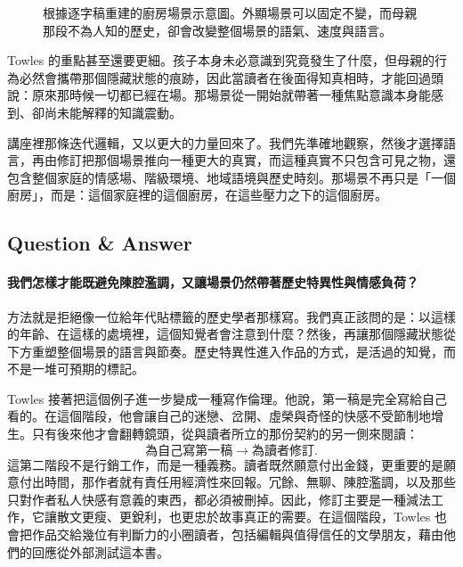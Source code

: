 \begin{figure}[h]
\centering
{}
\caption{根據逐字稿重建的廚房場景示意圖。外顯場景可以固定不變，而母親那段不為人知的歷史，卻會改變整個場景的語氣、速度與語言。}
\end{figure}

Towles 的重點甚至還要更細。孩子本身未必意識到究竟發生了什麼，但母親的行為必然會攜帶那個隱藏狀態的痕跡，因此當讀者在後面得知真相時，才能回過頭說：原來那時候一切都已經在場。那場景從一開始就帶著一種焦點意識本身能感到、卻尚未能解釋的知識震動。

講座裡那條迭代邏輯，又以更大的力量回來了。我們先準確地觀察，然後才選擇語言，再由修訂把那個場景推向一種更大的真實，而這種真實不只包含可見之物，還包含整個家庭的情感場、階級環境、地域語境與歷史時刻。那場景不再只是「一個廚房」，而是：這個家庭裡的這個廚房，在這些壓力之下的這個廚房。

\subsection{Question \& Answer}

\paragraph{我們怎樣才能既避免陳腔濫調，又讓場景仍然帶著歷史特異性與情感負荷？}

方法就是拒絕像一位給年代貼標籤的歷史學者那樣寫。我們真正該問的是：以這樣的年齡、在這樣的處境裡，這個知覺者會注意到什麼？然後，再讓那個隱藏狀態從下方重塑整個場景的語言與節奏。歷史特異性進入作品的方式，是活過的知覺，而不是一堆可預期的標記。

Towles 接著把這個例子進一步變成一種寫作倫理。他說，第一稿是完全寫給自己看的。在這個階段，他會讓自己的迷戀、岔開、虛榮與奇怪的快感不受節制地增生。只有後來他才會翻轉鏡頭，從與讀者所立的那份契約的另一側來閱讀：
\begin{equation}
\text{為自己寫第一稿} \longrightarrow \text{為讀者修訂}.
\end{equation}
這第二階段不是行銷工作，而是一種義務。讀者既然願意付出金錢，更重要的是願意付出時間，那作者就有責任用經濟性來回報。冗餘、無聊、陳腔濫調，以及那些只對作者私人快感有意義的東西，都必須被刪掉。因此，修訂主要是一種減法工作，它讓散文更瘦、更銳利，也更忠於故事真正的需要。在這個階段，Towles 也會把作品交給幾位有判斷力的小圈讀者，包括編輯與值得信任的文學朋友，藉由他們的回應從外部測試這本書。

